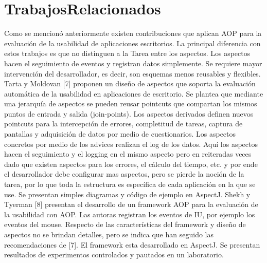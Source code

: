 \section{TrabajosRelacionados}
\label{sec:trabajos_relacionados}
Como se mencionó anteriormente existen contribuciones que aplican AOP para la evaluación de la usabilidad de aplicaciones escritorios. La principal diferencia con estos trabajos es que no distinguen a la Tarea entre los aspectos. Los aspectos hacen el seguimiento de eventos y registran datos simplemente. Se requiere mayor intervención del desarrollador, es decir, son esquemas menos reusables y flexibles.
Tarta y Moldovan [7] proponen un diseño de aspectos que soporta la evaluación automática de la usabilidad en aplicaciones de escritorio. Se plantea que mediante una jerarquía de aspectos se pueden reusar pointcuts que compartan los mismos puntos de entrada y salida (join-points). Los aspectos derivados definen nuevos pointcuts para la intercepción de errores, completitud de tareas, captura de pantallas y adquisición de datos por medio de cuestionarios. Los aspectos concretos por medio de los advices realizan el log de los datos. Aquí los aspectos hacen el seguimiento y el logging en el mismo aspecto pero en reiteradas veces dado que existen aspectos para los errores, el cálculo del tiempo, etc. y por ende el desarrollador debe configurar mas aspectos, pero se pierde la noción de la tarea, por lo que toda la estructura es específica de cada aplicación en la que se use. Se presentan simples diagramas y código de ejemplo en AspectJ.
Shekh y Tyerman [8] presentan el desarrollo de un framework AOP para la evaluación de la usabilidad con AOP. Las autoras registran los eventos de IU, por ejemplo los eventos del mouse. Respecto de las características del framework y diseño de aspectos no se brindan detalles, pero se indica que han seguido las recomendaciones de [7]. El framework esta desarrollado en AspectJ. Se presentan resultados de experimentos controlados y pautados en un laboratorio.

